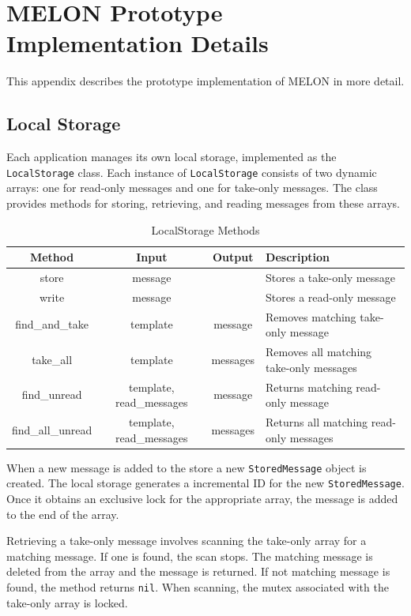 \chapter{MELON Prototype Implementation Details}

This appendix describes the prototype implementation of MELON in more detail.

\section{Local Storage}

Each application manages its own local storage, implemented as the \texttt{LocalStorage} class. Each instance of \texttt{LocalStorage} consists of two dynamic arrays: one for read-only messages and one for take-only messages. The class provides methods for storing, retrieving, and reading messages from these arrays.

\begin{table}\footnotesize
\centering
\caption{LocalStorage Methods}
\begin{tabular}{|c|c|c|p{5cm}|} \hline
\textbf{Method} & \textbf{Input} & \textbf{Output} & \textbf{Description} \\ \hline
store & message & & Stores a take-only message \\ \hline
write & message & & Stores a read-only message \\ \hline
find\_and\_take & template & message & Removes matching take-only message \\ \hline
take\_all & template & messages & Removes all matching take-only messages  \\ \hline
find\_unread & template, read\_messages & message & Returns matching read-only message  \\ \hline
find\_all\_unread & template, read\_messages & messages & Returns all matching read-only messages  \\ \hline
\end{tabular}
\label{fig:localstorageimpl}
\end{table}

When a new message is added to the store a new \texttt{StoredMessage} object is created. The local storage generates a incremental ID for the new \texttt{StoredMessage}. Once it obtains an exclusive lock for the appropriate array, the message is added to the end of the array.

Retrieving a take-only message involves scanning the take-only array for a matching message. If one is found, the scan stops. The matching message is deleted from the array and the message is returned. If not matching message is found, the method returns \texttt{nil}. When scanning, the mutex associated with the take-only array is locked.

